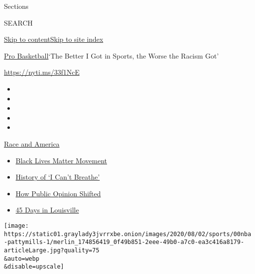 Sections

SEARCH

\protect\hyperlink{site-content}{Skip to
content}\protect\hyperlink{site-index}{Skip to site index}

\href{/section/sports/basketball}{Pro Basketball}\textbar{}`The Better I
Got in Sports, the Worse the Racism Got'

\url{https://nyti.ms/33f1NcE}

\begin{itemize}
\item
\item
\item
\item
\item
\end{itemize}

\href{https://www.nytimes3xbfgragh.onion/news-event/george-floyd-protests-minneapolis-new-york-los-angeles?action=click\&pgtype=Article\&state=default\&region=TOP_BANNER\&context=storylines_menu}{Race
and America}

\begin{itemize}
\tightlist
\item
  \href{https://www.nytimes3xbfgragh.onion/interactive/2020/07/03/us/george-floyd-protests-crowd-size.html?action=click\&pgtype=Article\&state=default\&region=TOP_BANNER\&context=storylines_menu}{Black
  Lives Matter Movement}
\item
  \href{https://www.nytimes3xbfgragh.onion/interactive/2020/06/28/us/i-cant-breathe-police-arrest.html?action=click\&pgtype=Article\&state=default\&region=TOP_BANNER\&context=storylines_menu}{History
  of `I Can't Breathe'}
\item
  \href{https://www.nytimes3xbfgragh.onion/interactive/2020/06/10/upshot/black-lives-matter-attitudes.html?action=click\&pgtype=Article\&state=default\&region=TOP_BANNER\&context=storylines_menu}{How
  Public Opinion Shifted}
\item
  \href{https://www.nytimes3xbfgragh.onion/interactive/2020/07/16/us/black-lives-matter-protests-louisville-breonna-taylor.html?action=click\&pgtype=Article\&state=default\&region=TOP_BANNER\&context=storylines_menu}{45
  Days in Louisville}
\end{itemize}

\texttt{[image: https://static01.graylady3jvrrxbe.onion/images/2020/08/02/sports/00nba-pattymills-1/merlin\_174856419\_0f49b851-2eee-49b0-a7c0-ea3c416a8179-articleLarge.jpg?quality=75\\\&auto=webp\\\&disable=upscale]}

